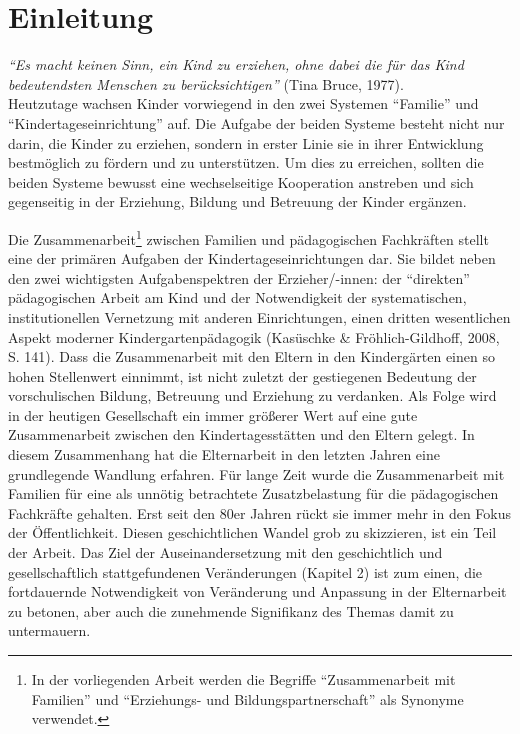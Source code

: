 \documentclass[12pt,a4paper]{article}
\begin{document}
\section{Einleitung}
\textit{"`Es macht keinen Sinn, ein Kind zu erziehen, ohne dabei die für das Kind bedeutendsten Menschen zu berücksichtigen"'}
 (Tina Bruce, 1977).\\
 
 
\noindent Heutzutage wachsen Kinder vorwiegend in den zwei Systemen "`Familie"' und "`Kindertageseinrichtung"' auf. Die Aufgabe der beiden Systeme besteht nicht nur darin, die Kinder zu erziehen, sondern in erster Linie sie in ihrer Entwicklung bestmöglich zu fördern und zu unterstützen. Um dies zu erreichen, sollten die beiden Systeme bewusst eine wechselseitige Kooperation anstreben und sich gegenseitig in der Erziehung, Bildung und Betreuung der Kinder ergänzen.
	  
Die Zusammenarbeit\footnote{In der vorliegenden Arbeit werden die Begriffe "`Zusammenarbeit mit Familien"' und "`Erziehungs- und Bildungspartnerschaft"' als Synonyme verwendet.} zwischen Familien und pä\-da\-go\-gisch\-en Fach\-kräf\-ten stellt eine der primären Aufgaben der Kindertageseinrichtungen dar. Sie bildet neben den zwei wichtigsten Aufgabenspektren der Erzieher/-innen: der "`direkten"' pä\-da\-go\-gisch\-en Arbeit am Kind und der Notwendigkeit der systematischen, institutionellen Vernetzung mit anderen Einrichtungen, einen dritten wesentlichen Aspekt moderner Kindergartenpädagogik (Kasüschke \& Fröhlich-Gildhoff, 2008, S. 141). Dass die Zusammenarbeit mit den Eltern in den Kindergärten einen so hohen Stellenwert einnimmt, ist nicht zuletzt der gestiegenen Bedeutung der vorschulischen Bildung, Betreuung und Erziehung zu verdanken. Als Folge wird in der heutigen Gesellschaft ein immer größerer Wert auf eine gute Zusammenarbeit zwischen den Kindertagesstätten und den Eltern gelegt. In diesem Zusammenhang hat die Elternarbeit in den letzten Jahren eine grundlegende Wandlung erfahren. Für lange Zeit wurde die Zusammenarbeit mit Familien für eine als unnötig betrachtete Zusatzbelastung für die pädagogischen Fachkräfte gehalten. Erst seit den 80er Jahren rückt sie immer mehr in den Fokus der Öffentlichkeit. Diesen geschichtlichen Wandel grob zu skizzieren, ist ein Teil der Arbeit. Das Ziel der Auseinandersetzung mit den geschichtlich und gesellschaftlich stattgefundenen Veränderungen (Kapitel 2) ist zum einen, die fortdauernde Notwendigkeit von Veränderung und Anpassung in der Elternarbeit zu betonen, aber auch die zunehmende Signifikanz des Themas damit zu untermauern.
\end{document}
